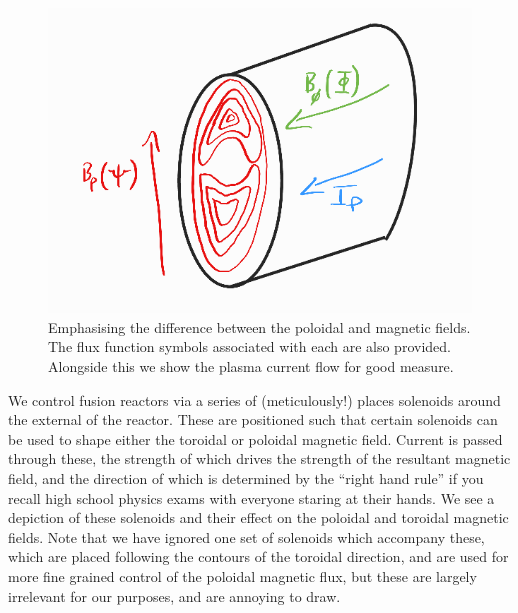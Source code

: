 \begin{figure}
    \centering
    \includegraphics[scale=2.0]{imgs/c1/flux-functions.png}
    \caption{Emphasising the difference between the poloidal and magnetic fields. The flux function symbols associated with each are 
    also provided. Alongside this we show the plasma current flow for good measure.}
    \label{flux-functions}
\end{figure}

We control fusion reactors via a series of (meticulously!) places solenoids around the external of the reactor. These are positioned 
such that certain solenoids can be used to shape either the toroidal or poloidal magnetic field. Current is passed through these,
the strength of which drives the strength of the resultant magnetic field, and the direction of which is determined by the 
``right hand rule'' if you recall high school physics exams with everyone staring at their hands. We see a depiction of these solenoids 
and their effect on the poloidal and toroidal magnetic fields. Note that we have ignored one set of solenoids which accompany these, which are placed 
following the contours of the toroidal direction, and are used for more fine grained control of the poloidal magnetic flux, but these are 
largely irrelevant for our purposes, and are annoying to draw.

